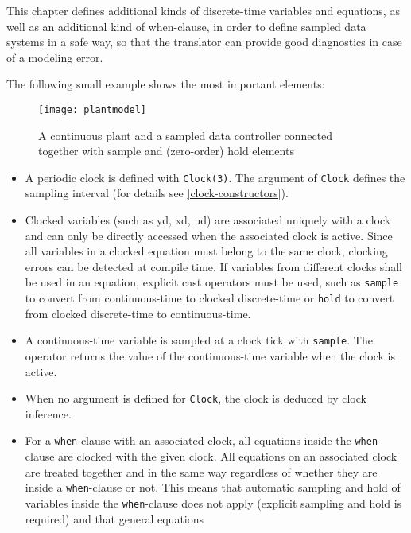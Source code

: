 \begin{nonnormative}
This chapter defines additional kinds of discrete-time
variables and equations, as well as an additional kind of when-clause,
in order to define sampled data systems in a safe way, so that the
translator can provide good diagnostics in case of a modeling error.

The following small example shows the most important elements:
\begin{figure}[H]
\caption{A continuous plant and a sampled data controller connected
together with sample and (zero-order) hold elements}
\begin{center}
\texttt{[image: plantmodel]}
\end{center}
\end{figure}

\begin{itemize}
\item
  A periodic clock is defined with \lstinline!Clock(3)!. The argument
  of \lstinline!Clock! defines the sampling interval (for details see \cref{clock-constructors}).
\item
  Clocked variables (such as yd, xd, ud) are associated uniquely
  with a clock and can only be directly accessed when the associated
  clock is active. Since all variables in a clocked equation must belong
  to the same clock, clocking errors can be detected at compile time. If
  variables from different clocks shall be used in an equation, explicit
  cast operators must be used, such as \lstinline!sample! to convert
  from continuous-time to clocked discrete-time or \lstinline!hold! to
  convert from clocked discrete-time to continuous-time.
\item
  A continuous-time variable is sampled at a clock tick with
  \lstinline!sample!. The operator returns the value of the
  continuous-time variable when the clock is active.
\item
  When no argument is defined for \lstinline!Clock!, the clock is
  deduced by clock inference.
\item
  For a \lstinline!when!-clause with an associated clock, all
  equations inside the \lstinline!when!-clause are clocked with the given
  clock. All equations on an associated clock are treated together and
  in the same way regardless of whether they are inside a
  \lstinline!when!-clause or not. This means that automatic sampling and
  hold of variables inside the \lstinline!when!-clause does not apply
  (explicit sampling and hold is required) and that general equations

\end{itemize}
\end{nonnormative}
